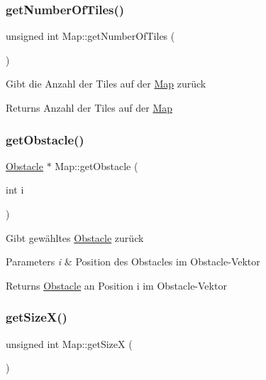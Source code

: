 \subsubsection{\texorpdfstring{get\+Number\+Of\+Tiles()}{getNumberOfTiles()}}
{\footnotesize\ttfamily unsigned int Map\+::get\+Number\+Of\+Tiles (\begin{DoxyParamCaption}{ }\end{DoxyParamCaption})}

Gibt die Anzahl der Tiles auf der \mbox{\hyperlink{class_map}{Map}} zurück \begin{DoxyReturn}{Returns}
Anzahl der Tiles auf der \mbox{\hyperlink{class_map}{Map}} 
\end{DoxyReturn}
\mbox{\label{class_map_a17453848c1ade655219c73c15a9b1b78}} 
\subsubsection{\texorpdfstring{get\+Obstacle()}{getObstacle()}}
{\footnotesize\ttfamily \mbox{\hyperlink{class_obstacle}{Obstacle}} $\ast$ Map\+::get\+Obstacle (\begin{DoxyParamCaption}\item[{int}]{i }\end{DoxyParamCaption})}

Gibt gewähltes \mbox{\hyperlink{class_obstacle}{Obstacle}} zurück 
\begin{DoxyParams}{Parameters}
{\em i} & Position des Obstacles im Obstacle-\/\+Vektor \\
\hline
\end{DoxyParams}
\begin{DoxyReturn}{Returns}
\mbox{\hyperlink{class_obstacle}{Obstacle}} an Position i im Obstacle-\/\+Vektor 
\end{DoxyReturn}
\mbox{\label{class_map_a295543a6b7ade2cdffd2faba2adda417}} 
\subsubsection{\texorpdfstring{get\+Size\+X()}{getSizeX()}}
{\footnotesize\ttfamily unsigned int Map\+::get\+SizeX (\begin{DoxyParamCaption}{ }\end{DoxyParamCaption})}

